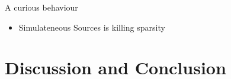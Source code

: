 \documentclass[12pt]{beamer}
\begin{document}
\begin{frame}{A curious behaviour}
\begin{itemize}
  \item Simulateneous Sources is killing sparsity
\end{itemize}
\begin{figure}
\end{figure}

\end{frame}

\section{Discussion and Conclusion}
\end{document}

